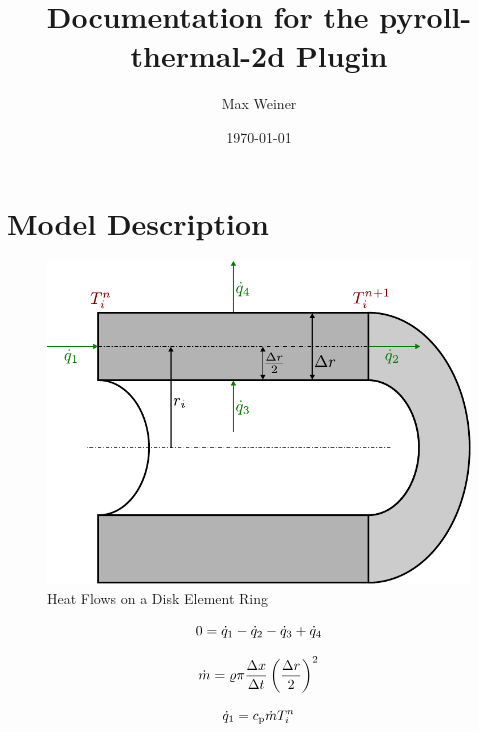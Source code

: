 \documentclass{scrartcl}
\begin{document}
    \title{Documentation for the pyroll-thermal-2d Plugin}
    \author{Max Weiner}
    \date{\today}

    \maketitle


    \section{Model Description}\label{sec:model-description}



    \begin{figure}
        \centering
        \includegraphics[scale=0.8]{img/heat_flow}
        \caption{Heat Flows on a Disk Element Ring}
        \label{fig:heat_flow}
    \end{figure}

    \begin{equation}
        0 = {\dot{q}}_1 - {\dot{q}}_2 - {\dot{q}}_3 + {\dot{q}}_4
        \label{eq:heat_flow_balance}
    \end{equation}

    \begin{equation}
        {\dot{m}} = {\varrho} \pi \frac{{\Delta x}}{{\Delta t}} \left( \frac{{\Delta r}}{2} \right)^2
        \label{eq:mass-flow}
    \end{equation}

    \begin{equation}
        {\dot{q}}_1 = {c_\mathrm{p}} {\dot{m}} {T}_{{i}}^{{n}}
        \label{eq:heat_flow_1}
    \end{equation}
\end{document}
